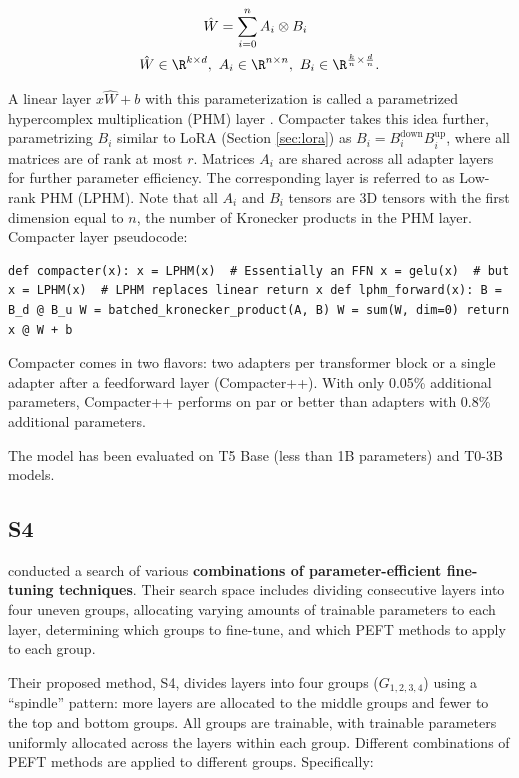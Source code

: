 \begin{equation}
\begin{aligned}
    \hat W &= \sum_{i=0}^{n} A_i \otimes B_i \\
    \hat W \in \R^{k \times d}, \text{ } &A_i \in \R^{n \times n}, \text{ } B_i \in \R^{\frac{k}{n} \times \frac{d}{n}}.
\end{aligned}
\end{equation}

A linear layer $x \hat W + b$ with this parameterization is called a parametrized hypercomplex multiplication (PHM) layer \citep{pha}. Compacter takes this idea further, parametrizing $B_i$ similar to LoRA (Section \ref{sec:lora}) as $B_i = B_i^{\text{down}} B_i^{\text{up}}$, where all matrices are of rank at most $r$. Matrices $A_i$ are shared across all adapter layers for further parameter efficiency. The corresponding layer is referred to as Low-rank PHM (LPHM). Note that all $A_i$ and $B_i$ tensors are 3D tensors with the first dimension equal to $n$, the number of Kronecker products in the PHM layer. Compacter layer pseudocode:

\begin{lstlisting}
def compacter(x): x = LPHM(x)  # Essentially an FFN x = gelu(x)  # but x = LPHM(x)  # LPHM replaces linear return x def lphm_forward(x): B = B_d @ B_u W = batched_kronecker_product(A, B) W = sum(W, dim=0) return x @ W + b
\end{lstlisting}

Compacter comes in two flavors: two adapters per transformer block or a single adapter after a feedforward layer (Compacter++). With only 0.05\% additional parameters, Compacter++ performs on par or better than adapters with 0.8\% additional parameters.

The model has been evaluated on T5 Base (less than 1B parameters) and T0-3B models.

\subsection{S4}
\label{sec:s4}
\citet{design_spaces} conducted a search of various \textbf{combinations of parameter-efficient fine-tuning techniques}. Their search space includes dividing consecutive layers into four uneven groups, allocating varying amounts of trainable parameters to each layer, determining which groups to fine-tune, and which PEFT methods to apply to each group.

Their proposed method, S4, divides layers into four groups ($G_{1,2,3,4}$) using a ``spindle'' pattern: more layers are allocated to the middle groups and fewer to the top and bottom groups. All groups are trainable, with trainable parameters uniformly allocated across the layers within each group. Different combinations of PEFT methods are applied to different groups. Specifically:


